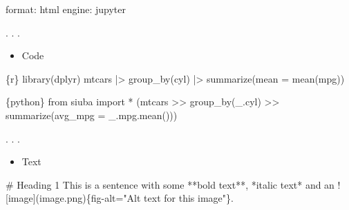 \documentclass[
  letterpaper,
  DIV=11,
  numbers=noendperiod]{scrartcl}
\newenvironment{Shaded}{\begin{snugshade}}{\end{snugshade}}
\newcommand{\AlertTok}[1]{\textcolor[rgb]{0.68,0.00,0.00}{#1}}
\newcommand{\AttributeTok}[1]{\textcolor[rgb]{0.40,0.45,0.13}{#1}}
\newcommand{\FunctionTok}[1]{\textcolor[rgb]{0.28,0.35,0.67}{#1}}
\newcommand{\ImportTok}[1]{\textcolor[rgb]{0.00,0.46,0.62}{#1}}
\newcommand{\InformationTok}[1]{\textcolor[rgb]{0.37,0.37,0.37}{#1}}
\newcommand{\KeywordTok}[1]{\textcolor[rgb]{0.00,0.23,0.31}{#1}}
\newcommand{\NormalTok}[1]{\textcolor[rgb]{0.00,0.23,0.31}{#1}}
\newcommand{\OperatorTok}[1]{\textcolor[rgb]{0.37,0.37,0.37}{#1}}
\newcommand{\SpecialCharTok}[1]{\textcolor[rgb]{0.37,0.37,0.37}{#1}}
\providecommand{\tightlist}{%
  \setlength{\itemsep}{0pt}\setlength{\parskip}{0pt}}\usepackage{longtable,booktabs,array}
\begin{document}
\begin{Shaded}
\begin{Highlighting}[]
\FunctionTok{format}\KeywordTok{:}\AttributeTok{ html}
\FunctionTok{engine}\KeywordTok{:}\AttributeTok{ jupyter}
\end{Highlighting}
\end{Shaded}

. . .

\begin{itemize}
\tightlist
\item
  Code
\end{itemize}

\begin{Shaded}
\begin{Highlighting}[]
\InformationTok{\textasciigrave{}\textasciigrave{}\textasciigrave{}\{r\}}
\FunctionTok{library}\NormalTok{(dplyr)}
\NormalTok{mtcars }\SpecialCharTok{|\textgreater{}} 
  \FunctionTok{group\_by}\NormalTok{(cyl) }\SpecialCharTok{|\textgreater{}} 
  \FunctionTok{summarize}\NormalTok{(}\AttributeTok{mean =} \FunctionTok{mean}\NormalTok{(mpg))}
\InformationTok{\textasciigrave{}\textasciigrave{}\textasciigrave{}}
\end{Highlighting}
\end{Shaded}

\begin{Shaded}
\begin{Highlighting}[]
\InformationTok{\textasciigrave{}\textasciigrave{}\textasciigrave{}\{python\}}
\ImportTok{from}\NormalTok{ siuba }\ImportTok{import} \OperatorTok{*}
\NormalTok{(mtcars}
  \OperatorTok{\textgreater{}\textgreater{}}\NormalTok{ group\_by(\_.cyl)}
  \OperatorTok{\textgreater{}\textgreater{}}\NormalTok{ summarize(avg\_mpg }\OperatorTok{=}\NormalTok{ \_.mpg.mean()))}
\InformationTok{\textasciigrave{}\textasciigrave{}\textasciigrave{}}
\end{Highlighting}
\end{Shaded}

. . .

\begin{itemize}
\tightlist
\item
  Text
\end{itemize}

\begin{Shaded}
\begin{Highlighting}[]
\FunctionTok{\# Heading 1}
\NormalTok{This is a sentence with some **bold text**, *italic text* and an }
\AlertTok{![image](image.png)}\NormalTok{\{fig{-}alt="Alt text for this image"\}.}
\end{Highlighting}
\end{Shaded}
\end{document}

